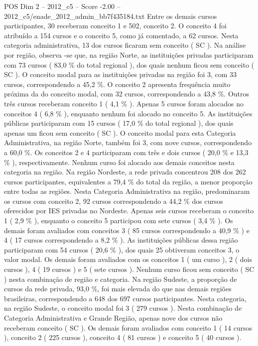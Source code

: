 \begin{textsample}{POS Dim 2 – 2012\_c5 – Score -2.00 – 2012\_c5/enade\_2012\_admin\_bb7f435184.txt}
Entre os demais cursos participantes, 30 receberam conceito 1 e 502, conceito 2.
O conceito 4 foi atribuído a 154 cursos e o conceito 5, como já comentado, a 62 cursos.
Nesta categoria administrativa, 13 dos cursos ficaram sem conceito ( SC ).
Na análise por região, observa -se que, na região Norte, as instituições privadas participaram com 73 cursos ( 83,0 \% do total regional ), dos quais nenhum ficou sem conceito ( SC ).
O conceito modal para as instituições privadas na região foi 3, com 33 cursos, correspondendo a 45,2 \%.
O conceito 2 apresenta frequência muito próxima da do conceito modal, com 32 cursos, correspondendo a 43,8 \%.
Outros três cursos receberam conceito 1 ( 4,1 \% ).
Apenas 5 cursos foram alocados no conceitos 4 ( 6,8 \% ), enquanto nenhum foi alocado no conceito 5.
As instituições públicas participaram com 15 cursos ( 17,0 \% do total regional ), dos quais apenas um ficou sem conceito ( SC ).
O conceito modal para esta Categoria Administrativa, na região Norte, também foi 3, com nove cursos, correspondendo a 60,0 \%.
Os conceitos 2 e 4 participaram com três e dois cursos ( 20,0 \% e 13,3 \% ), respectivamente.
Nenhum curso foi alocado aos demais conceitos nesta categoria na região.
Na região Nordeste, a rede privada concentrou 208 dos 262 cursos participantes, equivalentes a 79,4 \% do total da região, a menor proporção entre todas as regiões.
Nesta Categoria Administrativa na região, predominaram os cursos com conceito 2, 92 cursos correspondendo a 44,2 \% dos cursos oferecidos por IES privadas no Nordeste.
Apenas seis cursos receberam o conceito 1 ( 2,9 \% ), enquanto o conceito 5 participou com sete cursos ( 3,4 \% ).
Os demais foram avaliados com conceitos 3 ( 85 cursos correspondendo a 40,9 \% ) e 4 ( 17 cursos correspondendo a 8,2 \% ).
As instituições públicas dessa região participaram com 54 cursos ( 20,6 \% ), dos quais 25 obtiveram conceitos 3, o valor modal.
Os demais foram avaliados com os conceitos 1 ( um curso ), 2 ( dois cursos ), 4 ( 19 cursos ) e 5 ( sete cursos ).
Nenhum curso ficou sem conceito ( SC ) nesta combinação de região e categoria.
Na região Sudeste, a proporção de cursos da rede privada, 93,0 \%, foi mais elevada do que nas demais regiões brasileiras, correspondendo a 648 dos 697 cursos participantes.
Nesta categoria, na região Sudeste, o conceito modal foi 3 ( 279 cursos ).
Nesta combinação de Categoria Administrativa e Grande Região, apenas nove dos cursos não receberam conceito ( SC ).
Os demais foram avaliados com conceito 1 ( 14 cursos ), conceito 2 ( 225 cursos ), conceito 4 ( 81 cursos ) e conceito 5 ( 40 cursos ).

\end{textsample}
